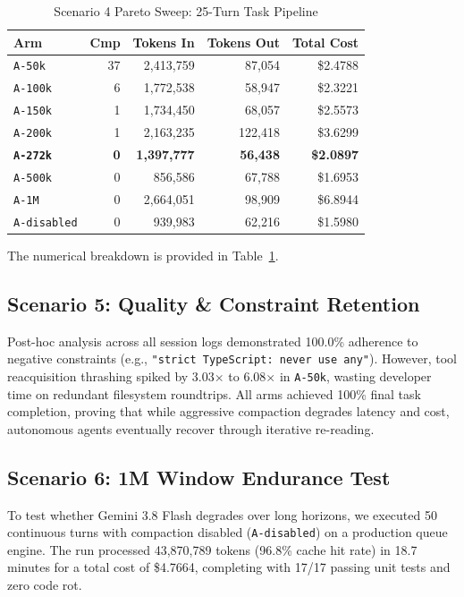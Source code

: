 \documentclass[10pt,twocolumn,a4paper]{article}
\begin{document}
\begin{table}[t]
\caption{Scenario 4 Pareto Sweep: 25-Turn Task Pipeline}
\label{tab:scenario4}
\centering
\footnotesize
\setlength{\tabcolsep}{2.2pt}
\begin{tabular}{@{}lrrrr@{}}
\toprule
\textbf{Arm} & \textbf{Cmp} & \textbf{Tokens In} & \textbf{Tokens Out} & \textbf{Total Cost} \\
\midrule
\texttt{A-50k} & 37 & 2,413,759 & 87,054 & \$2.4788 \\
\texttt{A-100k} & 6 & 1,772,538 & 58,947 & \$2.3221 \\
\texttt{A-150k} & 1 & 1,734,450 & 68,057 & \$2.5573 \\
\texttt{A-200k} & 1 & 2,163,235 & 122,418 & \$3.6299 \\
\textbf{\texttt{A-272k}} & \textbf{0} & \textbf{1,397,777} & \textbf{56,438} & \textbf{\$2.0897} \\
\texttt{A-500k} & 0 & 856,586 & 67,788 & \$1.6953 \\
\texttt{A-1M} & 0 & 2,664,051 & 98,909 & \$6.8944 \\
\texttt{A-disabled} & 0 & 939,983 & 62,216 & \$1.5980 \\
\bottomrule
\end{tabular}
\end{table}

The numerical breakdown is provided in Table~\ref{tab:scenario4}.

\subsection{Scenario 5: Quality \& Constraint Retention}
Post-hoc analysis across all session logs demonstrated 100.0\% adherence to negative constraints (e.g., \texttt{"strict TypeScript: never use any"}). However, tool reacquisition thrashing spiked by 3.03$\times$ to 6.08$\times$ in \texttt{A-50k}, wasting developer time on redundant filesystem roundtrips. All arms achieved 100\% final task completion, proving that while aggressive compaction degrades latency and cost, autonomous agents eventually recover through iterative re-reading.

\subsection{Scenario 6: 1M Window Endurance Test}
To test whether Gemini 3.8 Flash degrades over long horizons, we executed 50 continuous turns with compaction disabled (\texttt{A-disabled}) on a production queue engine. The run processed 43,870,789 tokens (96.8\% cache hit rate) in 18.7 minutes for a total cost of \$4.7664, completing with 17/17 passing unit tests and zero code rot.
\end{document}
